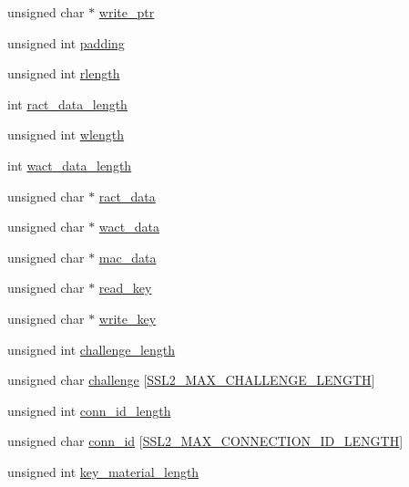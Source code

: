 \begin{DoxyCompactItemize}
\item 
unsigned char $\ast$ \hyperlink{structssl2__state__st_a5b32d2149c88641b60953acaeed60ca6}{write\+\_\+ptr}
\item 
unsigned int \hyperlink{structssl2__state__st_af616a36d9507e972aebae46f0c4042ee}{padding}
\item 
unsigned int \hyperlink{structssl2__state__st_a72f16b391f26540be7cf5edce31e98ab}{rlength}
\item 
int \hyperlink{structssl2__state__st_a2dfba1b24d539b1f3256e373c6f6160c}{ract\+\_\+data\+\_\+length}
\item 
unsigned int \hyperlink{structssl2__state__st_aa980d9013642059f71f185757cffaf37}{wlength}
\item 
int \hyperlink{structssl2__state__st_a07c130e7ce53fda12cbe7099433ac1ed}{wact\+\_\+data\+\_\+length}
\item 
unsigned char $\ast$ \hyperlink{structssl2__state__st_ac197c1c0487eeaeff1e2fbc093a5d0d9}{ract\+\_\+data}
\item 
unsigned char $\ast$ \hyperlink{structssl2__state__st_a5b67d20832e446bce04f9869b9ed9b9b}{wact\+\_\+data}
\item 
unsigned char $\ast$ \hyperlink{structssl2__state__st_a864bba5c02f441cc0143c2acbea9e152}{mac\+\_\+data}
\item 
unsigned char $\ast$ \hyperlink{structssl2__state__st_a3f7fff0bb61bf183dbb697ec6869683a}{read\+\_\+key}
\item 
unsigned char $\ast$ \hyperlink{structssl2__state__st_ac47926ac7bee66ed1d15a2e36048358e}{write\+\_\+key}
\item 
unsigned int \hyperlink{structssl2__state__st_a2f5573105eac56959a326af84db930c5}{challenge\+\_\+length}
\item 
unsigned char \hyperlink{structssl2__state__st_ab5b274a88ecb7d7ffe71210e7c6962ef}{challenge} \mbox{[}\hyperlink{ssl_2ssl2_8h_a57b1a488c4a080127cb6254c2e67b752}{S\+S\+L2\+\_\+\+M\+A\+X\+\_\+\+C\+H\+A\+L\+L\+E\+N\+G\+E\+\_\+\+L\+E\+N\+G\+TH}\mbox{]}
\item 
unsigned int \hyperlink{structssl2__state__st_aac92d44b1ad47635777ede390343bd11}{conn\+\_\+id\+\_\+length}
\item 
unsigned char \hyperlink{structssl2__state__st_a6bdd35f4cb5e1196dc4b7ce02b5bed55}{conn\+\_\+id} \mbox{[}\hyperlink{ssl_2ssl2_8h_ad847ccaa8f765b562593b5f8db91741b}{S\+S\+L2\+\_\+\+M\+A\+X\+\_\+\+C\+O\+N\+N\+E\+C\+T\+I\+O\+N\+\_\+\+I\+D\+\_\+\+L\+E\+N\+G\+TH}\mbox{]}
\item 
unsigned int \hyperlink{structssl2__state__st_af60f500a4eaefb9a6756ff7c1f74d00c}{key\+\_\+material\+\_\+length}

\end{DoxyCompactItemize}
